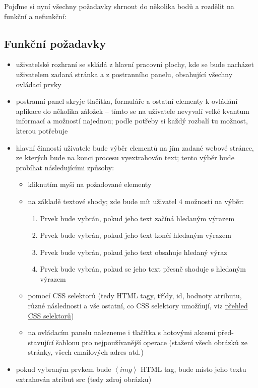 \documentclass[thesis=B,czech]{FITthesis}[2012/06/26]
\begin{document}
Pojďme si nyní všechny požadavky shrnout do několika bodů a rozdělit na funkční a nefunkční:

\subsection{Funkční požadavky}
\begin{itemize}
	\item uživatelské rozhraní se skládá z hlavní pracovní plochy, kde se bude nacházet uživatelem zadaná stránka a z postranního panelu, obsahující všechny ovládací prvky
	\item postranní panel skryje tlačítka, formuláře a ostatní elementy k ovládání aplikace do několika záložek -- tímto se na uživatele nevyvalí velké kvantum informací a možností najednou; podle potřeby si každý rozbalí tu možnost, kterou potřebuje
	\item hlavní činností uživatele bude výběr elementů na jím zadané webové stránce, ze kterých bude na konci procesu vyextrahován text; tento výběr bude probíhat následujícími způsoby:
	\begin{itemize}
		\item kliknutím myši na požadované elementy
		\item na základě textové shody; zde bude mít uživatel 4 možnosti na výběr:
		\begin{enumerate}
			\item Prvek bude vybrán, pokud jeho text začíná hledaným výrazem
			\item Prvek bude vybrán, pokud jeho text končí hledaným výrazem
			\item Prvek bude vybrán, pokud jeho text obsahuje hledaný výraz
			\item Prvek bude vybrán, pokud se jeho text přesně shoduje s hledaným výrazem
		\end{enumerate}
		\item pomocí CSS selektorů (tedy HTML tagy, třídy, id, hodnoty atributu, různé následnosti a vše ostatní, co CSS selektory umožňují, viz \href{https://www.w3schools.com/cssref/css_selectors.asp}{přehled CSS selektorů})
		\item na ovládacím panelu nalezneme i tlačítka s hotovými akcemi před-stavující šablonu pro nejpoužívanější operace (stažení všech obrázků ze stránky, všech emailových adres atd.)
	\end{itemize}
	\item pokud vybraným prvkem bude $\left<img\right>$ HTML tag, bude místo jeho textu extrahován atribut \textsf{src} (tedy zdroj obrázku)

\end{itemize}
\end{document}
